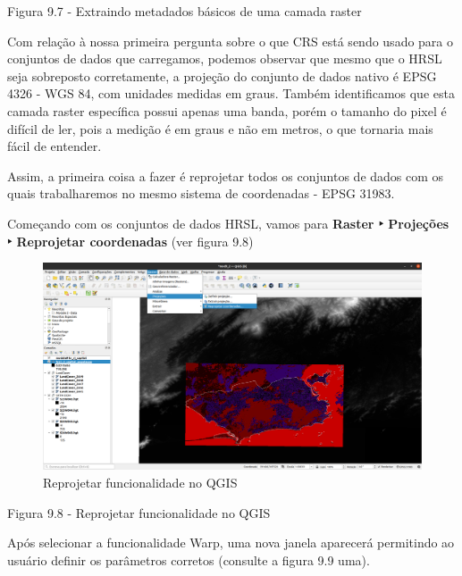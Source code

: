 \documentclass[
]{book}
\begin{document}
Figura 9.7 - Extraindo metadados básicos de uma camada raster

Com relação à nossa primeira pergunta sobre o que CRS está sendo usado para o conjuntos de dados que carregamos, podemos observar que mesmo que o HRSL seja sobreposto corretamente, a projeção do conjunto de dados nativo é EPSG 4326 - WGS 84, com unidades medidas em graus. Também identificamos que esta camada raster específica possui apenas uma banda, porém o tamanho do pixel é difícil de ler, pois a medição é em graus e não em metros, o que tornaria mais fácil de entender.

Assim, a primeira coisa a fazer é reprojetar todos os conjuntos de dados com os quais trabalharemos no mesmo sistema de coordenadas - EPSG 31983.

Começando com os conjuntos de dados HRSL, vamos para \textbf{Raster ‣ Projeções ‣ Reprojetar coordenadas} (ver figura 9.8)

\begin{figure}
\centering
\includegraphics{media/modulo9/fig98.png}
\caption{Reprojetar funcionalidade no QGIS}
\end{figure}

Figura 9.8 - Reprojetar funcionalidade no QGIS

Após selecionar a funcionalidade Warp, uma nova janela aparecerá permitindo ao usuário definir os parâmetros corretos (consulte a figura 9.9 uma).
\end{document}
